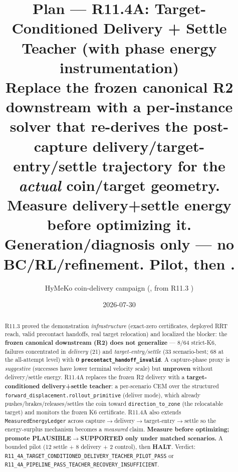 \documentclass[11pt]{article}
\title{\textbf{Plan --- R11.4A: Target-Conditioned Delivery + Settle Teacher (with phase energy instrumentation)}\\[2pt]
\large Replace the frozen canonical R2 downstream with a per-instance solver that re-derives the post-capture
delivery/target-entry/settle trajectory for the \emph{actual} coin/target geometry. Measure delivery+settle energy before
optimizing it. Generation/diagnosis only --- no BC/RL/refinement. Pilot, then \halt{}.}
\author{HyMeKo coin-delivery campaign \quad(\code{feature/r11-4a-target-conditioned-delivery-teacher}, from R11.3 \code{5b3995e1})}
\date{2026-07-30}
\newcommand{\code}[1]{\texttt{\small #1}}
\newcommand{\gate}[1]{\textcolor{blue!55!black}{\texttt{\small #1}}}
\newcommand{\halt}{\textcolor{red!70!black}{\textbf{HALT}}}
\begin{document}
\maketitle

\begin{abstract}
\noindent R11.3 proved the demonstration \emph{infrastructure} (exact-zero certificates, deployed RRT reach, valid
precontact handoffs, real target relocation) and localized the blocker: the \textbf{frozen canonical downstream (R2) does
not generalize} --- 8/64 strict-K6, failures concentrated in \emph{delivery} (21) and \emph{target-entry/settle} (33
scenario-best; 68 at the all-attempt level) with \textbf{0 \code{precontact\_handoff\_invalid}}. A capture-phase proxy is
\emph{suggestive} (successes have lower terminal velocity scale) but \textbf{unproven} without delivery/settle energy.
R11.4A replaces the frozen R2 delivery with a \textbf{target-conditioned delivery+settle teacher}: a per-scenario CEM over
the structured \code{forward\_displacement.rollout\_primitive} (deliver mode), which already pushes/brakes/releases/settles
the coin toward \code{direction\_to\_zone} (the relocatable target) and monitors the frozen K6 certificate. R11.4A also
extends \code{MeasuredEnergyLedger} across capture$\to$delivery$\to$target-entry$\to$settle so the energy-surplus mechanism
becomes a \emph{measured} claim. \textbf{Measure before optimizing; promote PLAUSIBLE$\to$SUPPORTED only under matched
scenarios.} A bounded pilot (12 settle + 8 delivery + 2 control), then \halt{}. Verdict:
\gate{R11\_4A\_TARGET\_CONDITIONED\_DELIVERY\_TEACHER\_PILOT\_PASS} or
\gate{R11\_4A\_PIPELINE\_PASS\_TEACHER\_RECOVERY\_INSUFFICIENT}.
\end{abstract}
\end{document}
